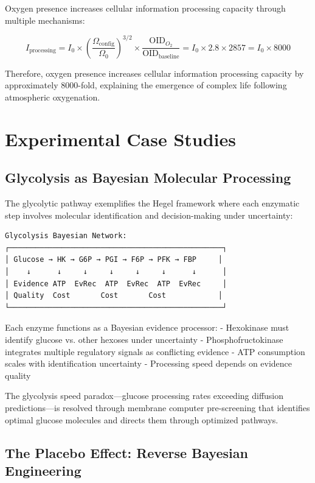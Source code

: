 \documentclass[12pt,a4paper]{article}
\begin{document}
Oxygen presence increases cellular information processing capacity through multiple mechanisms:

\begin{equation}
I_{\text{processing}} = I_0 \times \left(\frac{\Omega_{\text{config}}}{\Omega_0}\right)^{3/2} \times \frac{\text{OID}_{O_2}}{\text{OID}_{\text{baseline}}} = I_0 \times 2.8 \times 2857 = I_0 \times 8000
\end{equation}

Therefore, oxygen presence increases cellular information processing capacity by approximately 8000-fold, explaining the emergence of complex life following atmospheric oxygenation.

\section{Experimental Case Studies}

\subsection{Glycolysis as Bayesian Molecular Processing}

The glycolytic pathway exemplifies the Hegel framework where each enzymatic step involves molecular identification and decision-making under uncertainty:

\begin{verbatim}
Glycolysis Bayesian Network:
┌─────────────────────────────────────────────────┐
│ Glucose → HK → G6P → PGI → F6P → PFK → FBP     │
│    ↓      ↓     ↓     ↓     ↓     ↓      ↓      │
│ Evidence ATP  EvRec  ATP  EvRec  ATP  EvRec     │
│ Quality  Cost       Cost       Cost            │
└─────────────────────────────────────────────────┘
\end{verbatim}

Each enzyme functions as a Bayesian evidence processor:
- Hexokinase must identify glucose vs. other hexoses under uncertainty
- Phosphofructokinase integrates multiple regulatory signals as conflicting evidence
- ATP consumption scales with identification uncertainty
- Processing speed depends on evidence quality

The glycolysis speed paradox—glucose processing rates exceeding diffusion predictions—is resolved through membrane computer pre-screening that identifies optimal glucose molecules and directs them through optimized pathways.

\subsection{The Placebo Effect: Reverse Bayesian Engineering}
\end{document}
